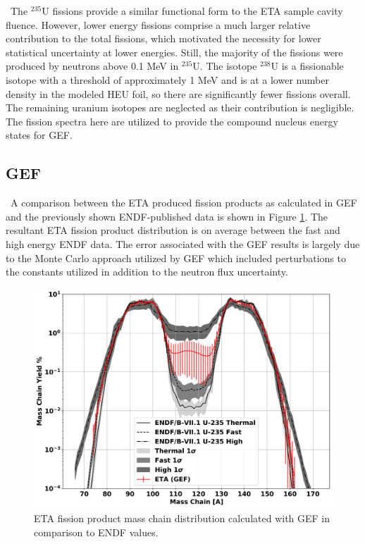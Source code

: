 \ The $\mathrm{^{235}}$U fissions provide a similar functional form to the ETA sample cavity fluence. 
However, lower energy fissions comprise a much larger relative contribution to the total fissions, which motivated the necessity for lower statistical uncertainty at lower energies. 
Still, the majority of the fissions were produced by neutrons above 0.1 MeV in $\mathrm{^{235}}$U. 
The isotope $\mathrm{^{238}}$U is a fissionable isotope with a threshold of approximately 1 MeV and is at a lower number density in the modeled HEU foil, so there are significantly fewer fissions overall. 
The remaining uranium isotopes are neglected as their contribution is negligible. 
The fission spectra here are utilized to provide the compound nucleus energy states for GEF. 

\subsection{GEF}

\ A comparison between the ETA produced fission products as calculated in GEF and the previously shown ENDF-published data is shown in Figure \ref{fig:fp1}. 
The resultant ETA fission product distribution is on average between the fast and high energy ENDF data. 
The error associated with the GEF results is largely due to the Monte Carlo approach utilized by GEF which included perturbations to the constants utilized in addition to the neutron flux uncertainty. 

\begin{figure}[!htbp]
	\centering
	\includegraphics[width=13cm]{Figures/Chapter4/FPs/GEF_ENDF.png}
	\caption{ETA fission product mass chain distribution calculated with GEF in comparison to ENDF values.}
	\label{fig:fp1}
\end{figure}


